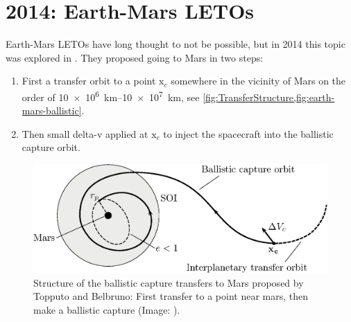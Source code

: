 \section{2014: Earth-Mars LETOs}
Earth-Mars LETOs have long thought to not be possible, but in 2014 this topic was explored in \cite{Topputo2014}. They proposed going to Mars in two steps:
\begin{enumerate}
	\item First a transfer orbit to a point $\mathrm{x}_c$ somewhere in the vicinity of Mars on the order of \SIrange{10e6}{10e7}{\km}, see \cref{fig:TransferStructure,fig:earth-mars-ballistic}.
	\item Then small delta-v applied at $\mathrm{x}_c$ to inject the spacecraft into the ballistic capture orbit.
\end{enumerate}

\begin{figure}[ht]
    \centering
    \includegraphics[width=0.70\linewidth]{fig/TransferStructure.eps}
    \caption{Structure of the ballistic capture transfers to Mars proposed by Topputo and Belbruno: First transfer to a point near mars, then make a ballistic capture (Image: \cite{Topputo2014}).}
    \label{fig:TransferStructure}
\end{figure}

